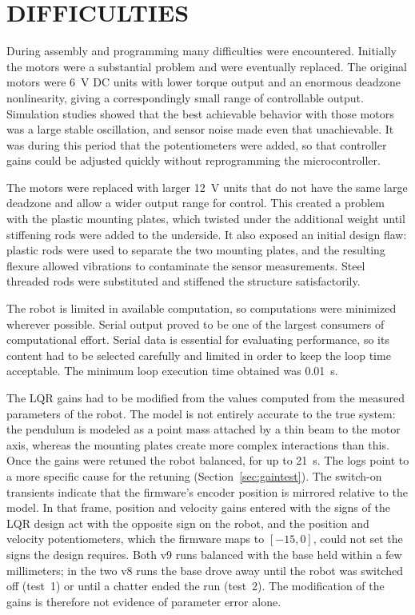 \section{DIFFICULTIES}
\label{sec:difficulties}

During assembly and programming many difficulties were encountered. Initially
the motors were a substantial problem and were eventually replaced. The original
motors were \SI{6}{V} DC units with lower torque output and an enormous deadzone
nonlinearity, giving a correspondingly small range of controllable output.
Simulation studies showed that the best achievable behavior with those motors
was a large stable oscillation, and sensor noise made even that unachievable.
It was during this period that the potentiometers were added, so that controller
gains could be adjusted quickly without reprogramming the microcontroller.

The motors were replaced with larger \SI{12}{V} units that do not have the same
large deadzone and allow a wider output range for control. This created a
problem with the plastic mounting plates, which twisted under the additional
weight until stiffening rods were added to the underside. It also exposed an
initial design flaw: plastic rods were used to separate the two mounting plates,
and the resulting flexure allowed vibrations to contaminate the sensor
measurements. Steel threaded rods were substituted and stiffened the structure
satisfactorily.

The robot is limited in available computation, so computations were minimized
wherever possible. Serial output proved to be one of the largest consumers of
computational effort. Serial data is essential for evaluating performance, so
its content had to be selected carefully and limited in order to keep the loop
time acceptable. The minimum loop execution time obtained was \SI{0.01}{s}.

The LQR gains had to be modified from the values computed from the measured
parameters of the robot. The model is not entirely accurate to the true system:
the pendulum is modeled as a point mass attached by a thin beam to the motor
axis, whereas the mounting plates create more complex interactions than this.
Once the gains were retuned the robot balanced, for up to \SI{21}{s}. The logs
point to a more specific cause for the retuning (Section~\ref{sec:gaintest}).
The switch-on transients indicate that the firmware's encoder position is
mirrored relative to the model. In that frame, position and velocity gains
entered with the signs of the LQR design act with the opposite sign on the
robot, and the position and velocity potentiometers, which the firmware maps to
$[-15,0]$, could not set the signs the design requires. Both v9 runs balanced
with the base held within a few millimeters; in the two v8 runs the base drove
away until the robot was switched off (test~1) or until a chatter ended the run
(test~2). The modification of the gains is therefore not evidence of parameter
error alone.

